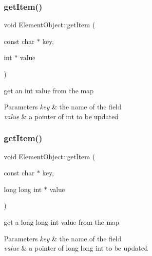 \subsubsection{\texorpdfstring{get\+Item()}{getItem()}\hspace{0.1cm}{\footnotesize\ttfamily [1/7]}}
{\footnotesize\ttfamily void Element\+Object\+::get\+Item (\begin{DoxyParamCaption}\item[{const char $\ast$}]{key,  }\item[{int $\ast$}]{value }\end{DoxyParamCaption})}

get an int value from the map


\begin{DoxyParams}{Parameters}
{\em key} & the name of the field \\
\hline
{\em value} & a pointer of int to be updated \\
\hline
\end{DoxyParams}
\mbox{\label{classElementObject_af0ed1f4a16e995e2f66707d3375f7f39}} 
\subsubsection{\texorpdfstring{get\+Item()}{getItem()}\hspace{0.1cm}{\footnotesize\ttfamily [2/7]}}
{\footnotesize\ttfamily void Element\+Object\+::get\+Item (\begin{DoxyParamCaption}\item[{const char $\ast$}]{key,  }\item[{long long int $\ast$}]{value }\end{DoxyParamCaption})}

get a long long int value from the map


\begin{DoxyParams}{Parameters}
{\em key} & the name of the field \\
\hline
{\em value} & a pointer of long long int to be updated \\
\hline
\end{DoxyParams}
\mbox{\label{classElementObject_a78d2c73282624ffed8607d2b8adc3435}} 
